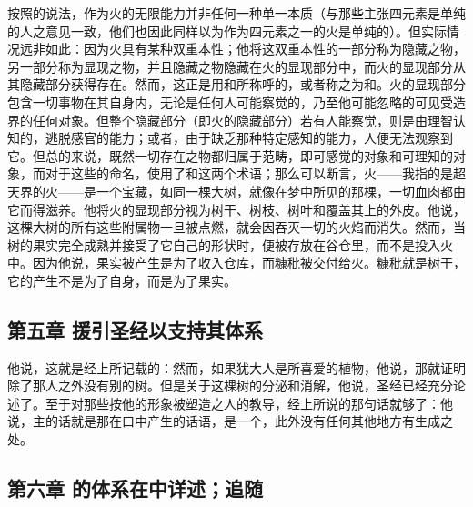按照的说法，作为火的无限能力并非任何一种单一本质（与那些主张四元素是单纯的人之意见一致，他们也因此同样以为作为四元素之一的火是单纯的）。但实际情况远非如此：因为火具有某种双重本性；他将这双重本性的一部分称为隐藏之物，另一部分称为显现之物，并且隐藏之物隐藏在火的显现部分中，而火的显现部分从其隐藏部分获得存在。然而，这正是用和所称呼的，或者称之为和。火的显现部分包含一切事物在其自身内，无论是任何人可能察觉的，乃至他可能忽略的可见受造界的任何对象。但整个隐藏部分（即火的隐藏部分）若有人能察觉，则是由理智认知的，逃脱感官的能力；或者，由于缺乏那种特定感知的能力，人便无法观察到它。但总的来说，既然一切存在之物都归属于范畴，即可感觉的对象和可理知的对象，而对于这些的命名，使用了和这两个术语；那么可以断言，火——我指的是超天界的火——是一个宝藏，如同一棵大树，就像在梦中所见的那棵，一切血肉都由它而得滋养。他将火的显现部分视为树干、树枝、树叶和覆盖其上的外皮。他说，这棵大树的所有这些附属物一旦被点燃，就会因吞灭一切的火焰而消失。然而，当树的果实完全成熟并接受了它自己的形状时，便被存放在谷仓里，而不是投入火中。因为他说，果实被产生是为了收入仓库，而糠秕被交付给火。糠秕就是树干，它的产生不是为了自身，而是为了果实。\par


\subsection{第五章 援引圣经以支持其体系}

他说，这就是经上所记载的：然而，如果犹大人是所喜爱的植物，他说，那就证明除了那人之外没有别的树。但是关于这棵树的分泌和消解，他说，圣经已经充分论述了。至于对那些按他的形象被塑造之人的教导，经上所说的那句话就够了：他说，主的话就是那在口中产生的话语，是一个，此外没有任何其他地方有生成之处。\par


\subsection{第六章 的体系在中详述；追随}

